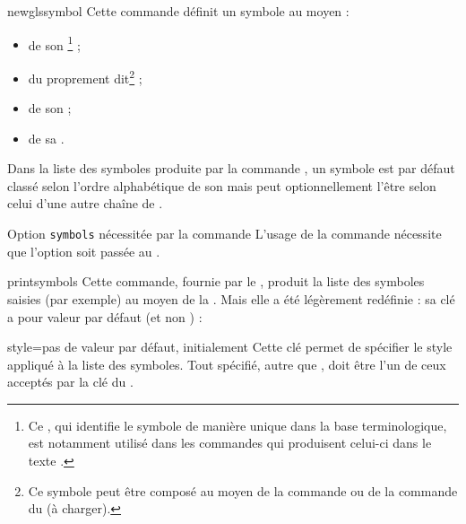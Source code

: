 \begin{docCommand}{newglssymbol}{}
  Cette commande définit un symbole au moyen :
  \begin{itemize}
  \item de son \footnote{Ce , qui identifie le symbole de
      manière unique dans la base terminologique, est notamment utilisé dans
      les commandes qui produisent celui-ci dans le texte .} ;
  \item du  proprement dit\footnote{Ce symbole peut être composé
      au moyen de la commande  ou de la commande  du  (à charger).} ;
  \item de son  ;
  \item de sa .
  \end{itemize}
  Dans la liste des symboles produite par la commande , un
  symbole est par défaut classé selon l'ordre alphabétique de son 
  mais peut optionnellement l'être selon celui d'une autre chaîne de
  .
\end{docCommand}

\begin{dbwarning}{Option \texttt{symbols} nécessitée par la commande
    \protect{}}{}
  L'usage de la commande  nécessite que l'option
   soit passée au .
\end{dbwarning}

\begin{docCommand}{printsymbols}{}
  Cette commande, fournie par le , produit la liste des
  symboles saisies (par exemple) au moyen de la . Mais
  elle a été légèrement redéfinie : sa clé  a pour valeur par
  défaut  (et non ) :
  \begin{docKey}{style}{=\textbar{}}{pas de valeur
      par défaut, initialement }
    Cette clé permet de spécifier le style appliqué à la liste des
    symboles. Tout  spécifié, autre que ,
    doit être l'un de ceux acceptés par la clé  du
    .
  \end{docKey}
\end{docCommand}

